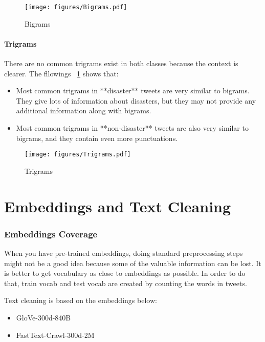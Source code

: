 \begin{figure}[htbp]
	\centering
	\texttt{[image: figures/Bigrams.pdf]}
	\caption{Bigrams}
	\label{fig:Bigrams}
\end{figure}

\paragraph{Trigrams}
There are no common trigrams exist in both classes  because the context is clearer.
The fllowings ~\cref{fig:Bigrams} shows that:
\begin{itemize}
	\item
	Most common trigrams in **disaster** tweets are very similar to bigrams. 
	They give lots of information about disasters, but they may not provide any 
	additional information along with bigrams.
	\item
	Most common trigrams in **non-disaster** tweets are also very similar to bigrams, and they contain even more punctuations.
\end{itemize}

\begin{figure}[htbp]
	\centering
	\texttt{[image: figures/Trigrams.pdf]}
	\caption{Trigrams}
	\label{fig:Trigrams}
\end{figure}


\section{Embeddings and Text Cleaning}
\subsubsection{Embeddings Coverage}

When you have pre-trained embeddings, doing standard preprocessing 
steps  might not be a good idea because some of the valuable 
information can be lost. It is better to get vocabulary as close 
to embeddings as possible. In order to do that, train vocab and 
test vocab are created by counting the words in tweets.

Text cleaning is based on the embeddings below:

\begin{itemize}
	\item GloVe-300d-840B
	\item FastText-Crawl-300d-2M 
\end{itemize}

